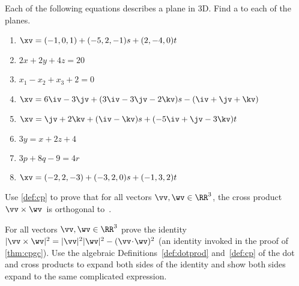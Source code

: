 \begin{exercise} \label{ex:} 
Each of the following equations describes a plane in 3D.
Find a  to each of the planes.
\begin{enumerate}
\item \(\xv=(-1,0,1)+(-5,2,-1)s+(2,-4,0)t\)

\item \(2x+2y+4z=20\)

\item \(x_1-x_2+x_3+2=0\)
\answer{\(\propto\iv-\jv+\kv\)}

\item \(\xv=6\iv-3\jv+(3\iv-3\jv-2\kv)s-(\iv+\jv+\kv)\)
\answer{\(\propto\iv+5\jv-6\kv\)}

\item \(\xv=\jv+2\kv+(\iv-\kv)s+(-5\iv+\jv-3\kv)t\)
\answer{\(\propto\iv+8\jv+\kv\)}

\item \(3y=x+2z+4\)
\answer{\(\propto -\iv+3\jv-2\kv\)}

\item \(3p+8q-9=4r\)

\item \(\xv=(-2,2,-3)+(-3,2,0)s+(-1,3,2)t\)

\end{enumerate}
\end{exercise}







\begin{exercise} \label{ex:cpga} 
Use \autoref{def:cp} to prove that for all vectors \(\vv,\wv\in\RR^3\), the cross product~\(\vv\times\wv\)~is orthogonal to~\wv.
\end{exercise}




\begin{exercise} \label{ex:cpgc} 
For all vectors \(\vv,\wv\in\RR^3\) prove the identity \(|\vv\times\wv|^2=|\vv|^2|\wv|^2-(\vv\cdot\wv)^2\) (an identity invoked in the proof of \autoref{thm:cpgc}). 
Use the algebraic Definitions~\ref{def:dotprod} and~\ref{def:cp} of the dot and cross products to expand both sides of the identity and show both sides expand to the same complicated expression.
\end{exercise}




